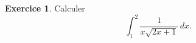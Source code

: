 \documentclass[a4paper, 11pt,openany]{article}%
\theoremstyle{plain}
\theoremstyle{definition}
\newtheorem{exo}{Exercice}
\newtheorem{sol}{Solution de l'exercice}
\theoremstyle{remark}
\begin{document}


\begin{exo}
Calculer
\[ \int_1^2 \frac{1}{x \sqrt{2x+1}} \, dx.\]
\end{exo}

\end{document}
